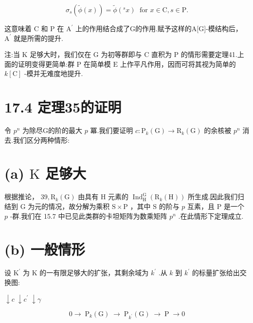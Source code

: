\documentclass[10pt]{article}
\begin{document}
\[
{\sigma }_{s}\left( {\widetilde{\phi }\left( x\right) }\right)  = \widetilde{\phi }\left( {{}^{s}x}\right) \;\text{ for }x \in  \mathrm{C},s \in  \mathrm{P}.
\]

这意味着 \(\mathrm{C}\) 和 \(\mathrm{P}\) 在 \({\mathrm{A}}^{\prime }\) 上的作用结合成了G的作用.赋予这样的A[G]-模结构后， \({\mathrm{A}}^{\prime }\) 就是所需的提升.

注:当 \(\mathrm{K}\) 足够大时，我们仅在 \(\mathrm{G}\) 为初等群即与 \(\mathrm{C}\) 直积为 \(\mathrm{P}\) 的情形需要定理41.上面的证明变得更简单:群 \(\mathrm{P}\) 在简单模 \(\mathrm{E}\) 上作平凡作用，因而可将其视为简单的 \(k\left\lbrack  \mathrm{C}\right\rbrack\) -模并无难度地提升.

\section*{17.4 定理35的证明}

令 \({p}^{n}\) 为除尽G的阶的最大 \(p\) 冪.我们要证明 \(c : {\mathrm{P}}_{k}\left( \mathrm{G}\right)  \rightarrow  {\mathrm{R}}_{k}\left( \mathrm{G}\right)\) 的余核被 \({p}^{n}\) 消去.我们区分两种情形:

\section*{(a) \(\mathrm{K}\) 足够大}

根据推论， \({39},{\mathrm{R}}_{k}\left( \mathrm{G}\right)\) 由具有 \(\mathrm{H}\) 元素的 \({\operatorname{Ind}}_{\mathrm{H}}^{\mathrm{G}}\left( {{\mathrm{R}}_{k}\left( \mathrm{H}\right) }\right)\) 所生成.因此我们归结到 \(\mathrm{G}\) 为元的情况，故分解为乘积 \(\mathrm{S} \times  \mathrm{P}\) ，其中 \(\mathrm{S}\) 的阶与 \(p\) 互素，且 \(\mathrm{P}\) 是一个 \(p\) -群.我们在 15.7 中已见此类群的卡坦矩阵为数乘矩阵 \({p}^{n}\) .在此情形下定理成立.

\section*{(b) 一般情形}

设 \({\mathrm{K}}^{\prime }\) 为 \(\mathrm{K}\) 的一有限足够大的扩张，其剩余域为 \({k}^{\prime }\) .从 \(k\) 到 \({k}^{\prime }\) 的标量扩张给出交换图:

\(\downarrow  c\; \downarrow  {c}^{\prime }\; \downarrow  \gamma\)

\[
0 \rightarrow  \;{\mathrm{P}}_{k}\left( \mathrm{G}\right) \; \rightarrow  \;{\mathrm{P}}_{{k}^{\prime }}\left( \mathrm{G}\right) \; \rightarrow  \;\mathrm{P}\; \rightarrow  0
\]
\end{document}
